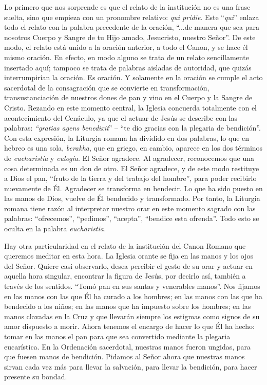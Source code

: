 			\begin{body}Lo primero que nos sorprende es que el relato de la institución no es una frase suelta, sino que empieza con un pronombre relativo: \textit{qui pridie}. Este “\textit{qui}”\textit{ }enlaza todo el relato con la palabra precedente de la oración, “...de manera que sea para nosotros Cuerpo y Sangre de tu Hijo amado, Jesucristo, nuestro Señor”. De este modo, el relato está unido a la oración anterior, a todo el Canon, y se hace él mismo oración. En efecto, en modo alguno se trata de un relato sencillamente insertado aquí; tampoco se trata de palabras aisladas de autoridad, que quizás interrumpirían la oración. Es oración. Y solamente en la oración se cumple el acto sacerdotal de la consagración que se convierte en transformación, transustanciación de nuestros dones de pan y vino en el Cuerpo y la Sangre de Cristo. Rezando en este momento central, la Iglesia concuerda totalmente con el acontecimiento del Cenáculo, ya que el actuar de Jesús se describe con las palabras:\textit{ “gratias agens benedixit}” – “te dio gracias con la plegaria de bendición”. Con esta expresión, la Liturgia romana ha dividido en dos palabras, lo que en hebreo es una sola, \textit{berakha}, que en griego, en cambio, aparece en los dos términos de \textit{eucharistía} y \textit{eulogía}. El Señor agradece. Al agradecer, reconocemos que una cosa determinada es un don de otro. El Señor agradece, y de este modo restituye a Dios el pan, “fruto de la tierra y del trabajo del hombre”, para poder recibirlo nuevamente de Él. Agradecer se transforma en bendecir. Lo que ha sido puesto en las manos de Dios, vuelve de Él bendecido y transformado. Por tanto, la Liturgia romana tiene razón al interpretar nuestro orar en este momento sagrado con las palabras: “ofrecemos”, “pedimos”, “acepta”, “bendice esta ofrenda”. Todo esto se oculta en la palabra \textit{eucharistia.}\end{body}
			
			\begin{body}Hay otra particularidad en el relato de la institución del Canon Romano que queremos meditar en esta hora. La Iglesia orante se fija en las manos y los ojos del Señor. Quiere casi observarlo, desea percibir el gesto de su orar y actuar en aquella hora singular, encontrar la figura de Jesús, por decirlo así, también a través de los sentidos. “Tomó pan en sus santas y venerables manos”. Nos fijamos en las manos con las que Él ha curado a los hombres; en las manos con las que ha bendecido a los niños; en las manos que ha impuesto sobre los hombres; en las manos clavadas en la Cruz y que llevarán siempre los estigmas como signos de su amor dispuesto a morir. Ahora tenemos el encargo de hacer lo que Él ha hecho: tomar en las manos el pan para que sea convertido mediante la plegaria eucarística. En la Ordenación sacerdotal, nuestras manos fueron ungidas, para que fuesen manos de bendición. Pidamos al Señor ahora que nuestras manos sirvan cada vez más para llevar la salvación, para llevar la bendición, para hacer presente su bondad.\end{body}
			
